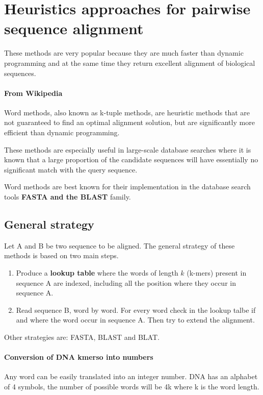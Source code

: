 \newpage
\section{Heuristics approaches for pairwise sequence alignment}
These methods are very popular because they are much faster than dynamic
programming and at the same time they return excellent alignment of biological
sequences.

\paragraph*{From Wikipedia}
Word methods, also known as k-tuple methods, are heuristic 
methods that are not guaranteed to find an optimal alignment solution,
but are  significantly more efficient than dynamic programming.

These methods are especially useful in large-scale database searches where
it is known that a large proportion of the candidate sequences will
have essentially no significant match with the query sequence. 

Word methods are best known for their implementation in the database
search tools \textbf{FASTA and the BLAST} family.

\subsection{General strategy}

Let A and B be two sequence to be aligned. The general strategy of these
methods is based on two main steps.

\begin{enumerate}
  \item Produce a \textbf{lookup table} where the words of length $k$
(k-mers) present in sequence A are indexed, including all the position
where they occur in sequence A.
  \item Read sequence B, word by word. For every word check in the lookup talbe
if and where the word occur in sequence A. Then try to extend the alignment.
\end{enumerate}

Other strategies are: FASTA, BLAST and BLAT.

\paragraph*{Conversion of DNA kmerso into numbers}

Any word can be easily translated into an integer number. 
DNA has an alphabet of 4 symbols, the number of possible words will be 4k
where k is the word length.

